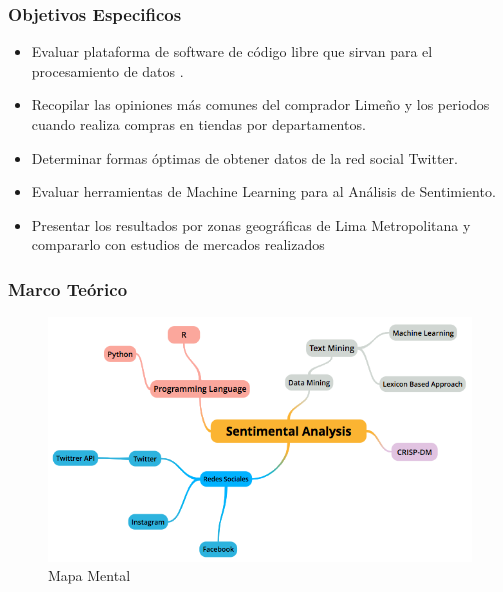 \documentclass{beamer}
\begin{document}
%
\begin{frame}
\frametitle{Objetivos Especificos}
\begin{itemize}
\item Evaluar plataforma de software de código libre que sirvan para el procesamiento de datos .
\item Recopilar las opiniones m\'as comunes del comprador Limeño y los periodos cuando realiza compras en tiendas por departamentos.
\item Determinar formas \'optimas de obtener datos de la red social Twitter.
\item Evaluar herramientas de Machine Learning para al Análisis de Sentimiento.
\item Presentar los resultados por zonas geogr\'aficas de Lima Metropolitana y compararlo con estudios de mercados realizados
\end{itemize}

\end{frame}


%
\begin{frame}
\frametitle{Marco Te\'orico}
\begin{figure}[H]
\centering
\includegraphics[scale=0.4]{../chapters/img/Ch04_MM.PNG}
\caption{Mapa Mental}
\end{figure}
\end{frame}
\end{document}
